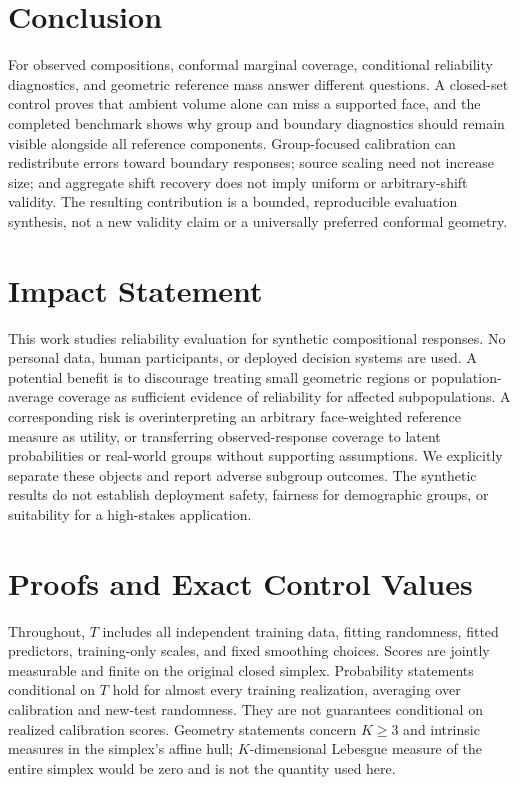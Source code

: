 \documentclass{article}
\theoremstyle{plain}
\begin{document}
\section{Conclusion}
\label{sec:conclusion}
For observed compositions, conformal marginal coverage, conditional reliability diagnostics, and geometric reference mass answer different questions. A closed-set control proves that ambient volume alone can miss a supported face, and the completed benchmark shows why group and boundary diagnostics should remain visible alongside all reference components. Group-focused calibration can redistribute errors toward boundary responses; source scaling need not increase size; and aggregate shift recovery does not imply uniform or arbitrary-shift validity. The resulting contribution is a bounded, reproducible evaluation synthesis, not a new validity claim or a universally preferred conformal geometry.
\label{main-end}

\clearpage
\section*{Impact Statement}
This work studies reliability evaluation for synthetic compositional responses. No personal data, human participants, or deployed decision systems are used. A potential benefit is to discourage treating small geometric regions or population-average coverage as sufficient evidence of reliability for affected subpopulations. A corresponding risk is overinterpreting an arbitrary face-weighted reference measure as utility, or transferring observed-response coverage to latent probabilities or real-world groups without supporting assumptions. We explicitly separate these objects and report adverse subgroup outcomes. The synthetic results do not establish deployment safety, fairness for demographic groups, or suitability for a high-stakes application.




\clearpage
\appendix
\onecolumn

\section{Proofs and Exact Control Values}
\label{app:proofs}
Throughout, $T$ includes all independent training data, fitting randomness, fitted predictors, training-only scales, and fixed smoothing choices. Scores are jointly measurable and finite on the original closed simplex. Probability statements conditional on $T$ hold for almost every training realization, averaging over calibration and new-test randomness. They are not guarantees conditional on realized calibration scores. Geometry statements concern $K\geq3$ and intrinsic measures in the simplex's affine hull; $K$-dimensional Lebesgue measure of the entire simplex would be zero and is not the quantity used here.
\end{document}
